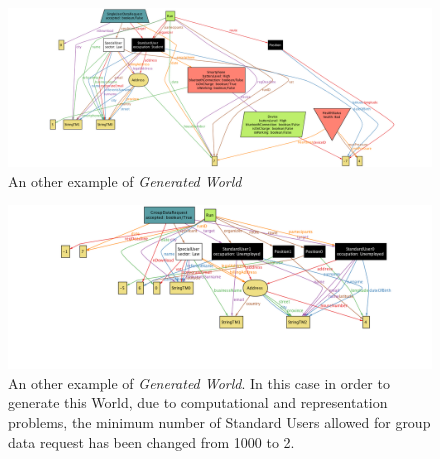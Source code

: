 \begin{figure}[H]
 \begin{center}
   \includegraphics[width=0.80\paperwidth]{./img/alloy/alloy5.png}
   \hspace{0.05\linewidth}
   \centering
   \caption{An other example of \textit{Generated World}}
   \label{img:generatedWorld}
 \end{center}
 \end{figure}

 \begin{figure}[H]
 \begin{center}
   \includegraphics[width=0.80\paperwidth]{./img/alloy/alloy6.png}
   \hspace{0.05\linewidth}
   \centering
   \caption{An other example of \textit{Generated World}. In this case in order to generate this World, due to computational and representation problems, the minimum number of Standard Users allowed for group data request has been changed from 1000 to 2.}
   \label{img:generatedWorld}
 \end{center}
 \end{figure}


\vspace{1cm}

